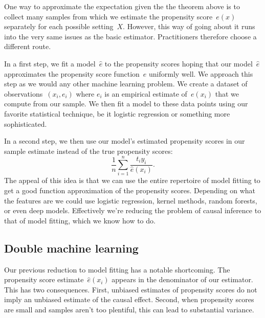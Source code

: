 \documentclass{tufte-book}
\begin{document}
One way to approximate the expectation given the the theorem above is to
collect many samples from which we estimate the propensity
score~\(e(x)\) separately for each possible setting~\(X\). However, this
way of going about it runs into the very same issues as the basic
estimator. Practitioners therefore choose a different route.

In a first step, we fit a model~\(\hat e\) to the propensity scores
hoping that our model~\(\hat e\) approximates the propensity score
function~\(e\) uniformly well. We approach this step as we would any
other machine learning problem. We create a dataset of
observations~\((x_i, e_i)\) where \(e_i\) is an empirical estimate
of~\(e(x_i)\) that we compute from our sample. We then fit a model to
these data points using our favorite statistical technique, be it
logistic regression or something more sophisticated.

In a second step, we then use our model's estimated propensity scores in
our sample estimate instead of the true propensity scores: \[
\frac{1}{n} \sum_{i=1}^n \frac{t_i y_i}{\hat e (x_i)}.
\] The appeal of this idea is that we can use the entire repertoire of
model fitting to get a good function approximation of the propensity
scores. Depending on what the features are we could use logistic
regression, kernel methods, random forests, or even deep models.
Effectively we're reducing the problem of causal inference to that of
model fitting, which we know how to do.

\hypertarget{double-machine-learning}{%
\subsection{Double machine learning}\label{double-machine-learning}}

Our previous reduction to model fitting has a notable shortcoming. The
propensity score estimate~\(\hat e(x_i)\) appears in the denominator of
our estimator. This has two consequences. First, unbiased estimates of
propensity scores do not imply an unbiased estimate of the causal
effect. Second, when propensity scores are small and samples aren't too
plentiful, this can lead to substantial variance.
\end{document}
